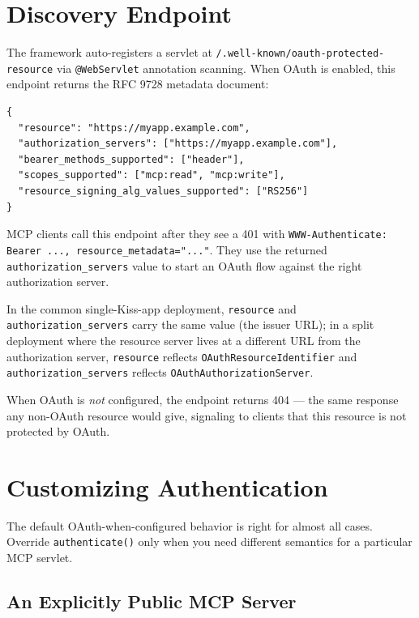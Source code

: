 \section{Discovery Endpoint}
\label{sec:oauth-discovery}

The framework auto-registers a servlet at \texttt{/.well-known/oauth-protected-resource} via \texttt{@WebServlet} annotation scanning.  When OAuth is enabled, this endpoint returns the RFC 9728 metadata document:

\begin{lstlisting}[style=java]
{
  "resource": "https://myapp.example.com",
  "authorization_servers": ["https://myapp.example.com"],
  "bearer_methods_supported": ["header"],
  "scopes_supported": ["mcp:read", "mcp:write"],
  "resource_signing_alg_values_supported": ["RS256"]
}
\end{lstlisting}

\noindent
MCP clients call this endpoint after they see a 401 with \texttt{WWW-Authenticate: Bearer ..., resource\_metadata="..."}.  They use the returned \texttt{authorization\_servers} value to start an OAuth flow against the right authorization server.

In the common single-Kiss-app deployment, \texttt{resource} and \texttt{authori\-zation\_servers} carry the same value (the issuer URL); in a split deployment where the resource server lives at a different URL from the authorization server, \texttt{resource} reflects \texttt{OAuthResourceIdentifier} and \texttt{authorization\_servers} reflects \texttt{OAuthAuthorizationServer}.

When OAuth is \emph{not} configured, the endpoint returns 404 --- the same response any non-OAuth resource would give, signaling to clients that this resource is not protected by OAuth.

\section{Customizing Authentication}
\label{sec:oauth-custom}

The default OAuth-when-configured behavior is right for almost all cases.  Override \texttt{authenticate()} only when you need different semantics for a particular MCP servlet.

\subsection{An Explicitly Public MCP Server}

